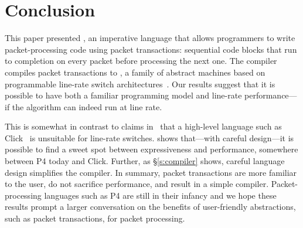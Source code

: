 \section{Conclusion}
\label{s:conclusion}

This paper presented \pktlanguage, an imperative language that allows
programmers to write packet-processing code using packet transactions:
sequential code blocks that run to completion on every packet before processing
the next one. The \pktlanguage compiler compiles packet transactions
to \absmachine, a family of abstract machines based on
programmable line-rate switch architectures~\cite{flexpipe, xpliant, rmt}. Our
results suggest that it is possible to have both a familiar programming model
and line-rate performance---if the algorithm can indeed run at line rate.

This is somewhat in contrast to claims in~\cite{p4} that a high-level language
such as Click~\cite{click} is unsuitable for line-rate switches. \pktlanguage
shows that---with careful design---it is possible to find a sweet spot between
expressiveness and performance, somewhere between P4 today and Click. Further,
as \S\ref{s:compiler} shows, careful language design simplifies the compiler.
In summary, packet transactions are more familiar to the user, do not sacrifice
performance, and result in a simple compiler.  Packet-processing languages such
as P4 are still in their infancy and we hope these results prompt a larger
conversation on the benefits of user-friendly abstractions, such as packet
transactions, for packet processing.
